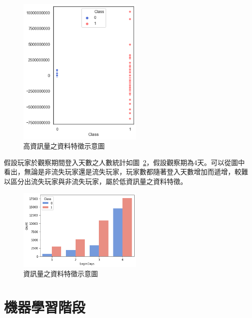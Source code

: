\begin{figure}[!htb]
  \begin{center}
    \includegraphics[width=0.55\textwidth]{figures/Image_ValuableFeatures.png}
    \caption[高資訊量之資料特徵示意圖]{高資訊量之資料特徵示意圖}
    \label{fig:Image_ValuableFeatures}
  \end{center}
\end{figure}

假設玩家於觀察期間登入天數之人數統計如圖~\ref{fig:Image_WorthlessFeatures}，假設觀察期為4天。可以從圖中看出，無論是非流失玩家還是流失玩家，玩家數都隨著登入天數增加而遞增，較難以區分出流失玩家與非流失玩家，屬於低資訊量之資料特徵。

\begin{figure}[!htb]
  \begin{center}
    \includegraphics[width=0.55\textwidth]{figures/Image_WorthlessFeatures.png}
    \caption[低資訊量之資料特徵示意圖]{資訊量之資料特徵示意圖}
    \label{fig:Image_WorthlessFeatures}
  \end{center}
\end{figure}

\section{機器學習階段}
\label{sec:MachineLearning}

